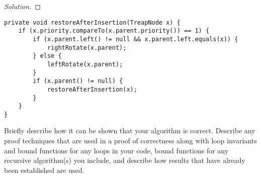 \documentclass[12pt]{article}
\newenvironment{problem}[2][Problem]{\begin{trivlist}
\item[\hskip \labelsep {\bfseries #1}\hskip \labelsep {\bfseries #2.}]}{\end{trivlist}}
\newenvironment{solution}{\renewcommand\qedsymbol{$\blacksquare$}\begin{proof}[Solution]}{\end{proof}}
\begin{document}
\begin{solution}

\end{solution}



\begin{problem}{3}
\end{problem}

\begin{verbatim}
private void restoreAfterInsertion(TreapNode x) {
    if (x.priority.compareTo(x.parent.priority()) == 1) {
        if (x.parent.left() != null && x.parent.left.equals(x)) {
            rightRotate(x.parent);
        } else {
            leftRotate(x.parent);
        }
        if (x.parent() != null) {
            restoreAfterInsertion(x);
        }
    }
}
\end{verbatim}

\begin{problem}{4}
    Briefly describe how it can be shown that your algorithm is correct. Describe any proof techniques that are used in a proof of correctness along with loop invariants and bound functions for any loops in your code, bound functions for any recursive algorithm(s) you include, and describe how results that have already been established are used.
\end{problem}
\end{document}
